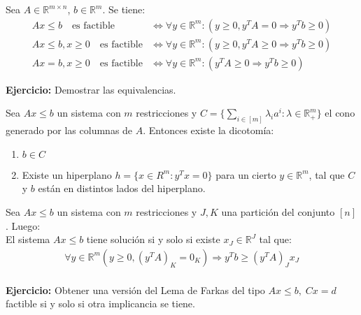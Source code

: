 \begin{lemm}
Sea $A \in \mathbb{R}^{m\times n}$, $b \in \mathbb{R}^{m}$. Se tiene:
\begin{align*}
   Ax\leq b \quad \text{es factible} &\Leftrightarrow \forall y \in \mathbb{R}^{m}:\left(y \geq 0, y^{T} A=0 \Longrightarrow y^{T} b \geq 0\right)\\
   Ax\leq b, x \geq 0 \quad \text{es factible} &\Leftrightarrow \forall y \in \mathbb{R}^{m}:\left(y \geq 0, y^{T} A \geq 0 \Longrightarrow y^{T} b \geq 0\right)\\
    Ax= b, x \geq 0 \quad \text{es factible} &\Leftrightarrow \forall y \in \mathbb{R}^{m}:\left(y^{T} A \geq 0 \Longrightarrow y^{T} b \geq 0 \right)
\end{align*}

\end{lemm}
\textbf{Ejercicio:} Demostrar las equivalencias.

\begin{lemm}
Sea $Ax\leq b$ un sistema con $m$ restricciones y $C = \{\sum_{i\in[m]} \lambda_{i}a^{i}:\lambda \in \mathbb{R}_{+}^{m}\}$ el cono generado por las columnas de $A$. Entonces existe la dicotomía:
\begin{enumerate}
    \item $b \in C$
    \item Existe un hiperplano $h=\{x \in R^{m}: y^{T}x=0\}$ para un cierto $y\in \mathbb{R}^{m}$, tal que $C$ y $b$ están en distintos lados del hiperplano.
\end{enumerate}
\end{lemm}

\begin{lemm}
Sea $Ax\leq b$ un sistema con $m$ restricciones y $J,K$ una partición del conjunto $[n]$. Luego:\\

El sistema $Ax\leq b$ tiene solución si y solo si existe $x_{J} \in \mathbb{R}^{J}$ tal que:
\begin{align*}
    \forall y \in \mathbb{R}^{m}\left(y \geq 0, (y^{T} A)_{K}=0_{K}\right) \Longrightarrow y^{T} b \geq (y^{T} A)_{J}x_{J} \\
\end{align*}
\end{lemm}

\textbf{Ejercicio:} Obtener una versión del Lema de Farkas del tipo $Ax\le b, \; Cx = d$ factible si y solo si otra implicancia se tiene.
% 
